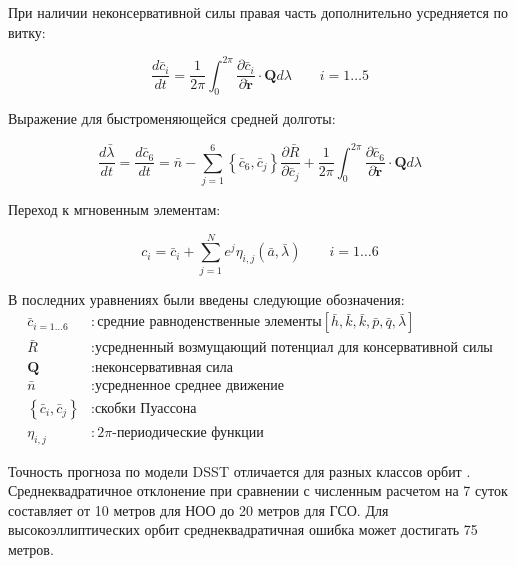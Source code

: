 При наличии неконсервативной силы правая часть дополнительно усредняется по витку:

\begin{equation*}
    \frac{d\bar{c}_i}{dt} = \frac{1}{2 \pi} \int_{0}^{2 \pi} \frac{\partial\bar{c}_i}{\partial\dot{\mathbf{r}}} 
                        \cdot \mathbf{Q} d\lambda \qquad i=1 \dots 5
\end{equation*}

Выражение для быстроменяющейся средней долготы:

\begin{equation*}
    \frac{d \bar{\lambda}}{dt} = \frac{d\bar{c}_6}{dt} = 
        \bar{n} -\sum_{j=1}^{6} \left\{\bar{c}_6, \bar{c}_j \right\} 
                                \frac{\partial \bar{R}}{\partial\bar{c}_j}
                +\frac{1}{2 \pi} \int_{0}^{2 \pi} \frac{\partial\bar{c}_6}{\partial\dot{\mathbf{r}}} 
                        \cdot \mathbf{Q} d\lambda
\end{equation*}

Переход к мгновенным элементам:

\begin{equation*}
    c_i = \bar{c}_i + \sum_{j=1}^{N} e^j \eta_{i, j}\left(\bar{a}, \bar{\lambda}\right) \qquad i = 1 \dots 6
\end{equation*}

В последних уравнениях были введены следующие обозначения:
\begin{align*}
    \bar{c}_{i=1 \dots 6} &: \text{средние равноденственные элементы} \left[\bar{h}, \bar{k}, \bar{k}, \bar{p}, \bar{q}, \bar{\lambda}\right] \\
    \bar{R} &: \text{усредненный возмущающий потенциал для консервативной силы} \\
    \mathbf{Q} &: \text{неконсервативная сила} \\
    \bar{n} &: \text{усредненное среднее движение} \\
    \left\{\bar{c}_i, \bar{c}_j \right\} &: \text{скобки Пуассона} \\
    \eta_{i, j} &: 2\pi \text{-периодические функции}
\end{align*}

Точность прогноза по модели DSST отличается для разных классов орбит \cite{setty2016}.
Среднеквадратичное отклонение при сравнении с численным расчетом на 7 суток составляет от 10 метров для НОО до 20 метров для ГСО.
Для высокоэллиптических орбит среднеквадратичная ошибка может достигать 75 метров.

